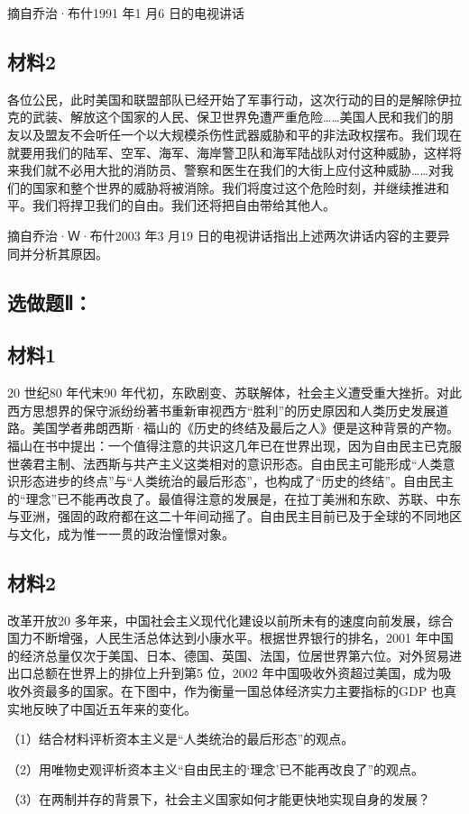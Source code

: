 \documentclass[UTF8,11pt]{ctexart}
\begin{document}
摘自乔治·布什1991 年1 月6 日的电视讲话

\subsection*{材料2}

各位公民，此时美国和联盟部队已经开始了军事行动，这次行动的目的是解除伊拉克的武装、解放这个国家的人民、保卫世界免遭严重危险……美国人民和我们的朋友以及盟友不会听任一个以大规模杀伤性武器威胁和平的非法政权摆布。我们现在就要用我们的陆军、空军、海军、海岸警卫队和海军陆战队对付这种威胁，这样将来我们就不必用大批的消防员、警察和医生在我们的大街上应付这种威胁……对我们的国家和整个世界的威胁将被消除。我们将度过这个危险时刻，并继续推进和平。我们将捍卫我们的自由。我们还将把自由带给其他人。

摘自乔治·Ｗ·布什2003 年3 月19 日的电视讲话指出上述两次讲话内容的主要异同并分析其原因。

\subsection*{选做题Ⅱ：}

\subsection*{材料1}

20 世纪80 年代末90 年代初，东欧剧变、苏联解体，社会主义遭受重大挫折。对此西方思想界的保守派纷纷著书重新审视西方“胜利”的历史原因和人类历史发展道路。美国学者弗朗西斯·福山的《历史的终结及最后之人》便是这种背景的产物。福山在书中提出：一个值得注意的共识这几年已在世界出现，因为自由民主已克服世袭君主制、法西斯与共产主义这类相对的意识形态。自由民主可能形成“人类意识形态进步的终点”与“人类统治的最后形态”，也构成了“历史的终结”。自由民主的“理念”已不能再改良了。最值得注意的发展是，在拉丁美洲和东欧、苏联、中东与亚洲，强固的政府都在这二十年间动摇了。自由民主目前已及于全球的不同地区与文化，成为惟一一贯的政治憧憬对象。


\subsection*{材料2}

改革开放20 多年来，中国社会主义现代化建设以前所未有的速度向前发展，综合国力不断增强，人民生活总体达到小康水平。根据世界银行的排名，2001 年中国的经济总量仅次于美国、日本、德国、英国、法国，位居世界第六位。对外贸易进出口总额在世界上的排位上升到第5 位，2002 年中国吸收外资超过美国，成为吸收外资最多的国家。在下图中，作为衡量一国总体经济实力主要指标的GDP 也真实地反映了中国近五年来的变化。


（1）结合材料评析资本主义是“人类统治的最后形态”的观点。


（2）用唯物史观评析资本主义“自由民主的‘理念’已不能再改良了”的观点。


（3）在两制并存的背景下，社会主义国家如何才能更快地实现自身的发展？
\end{document}
